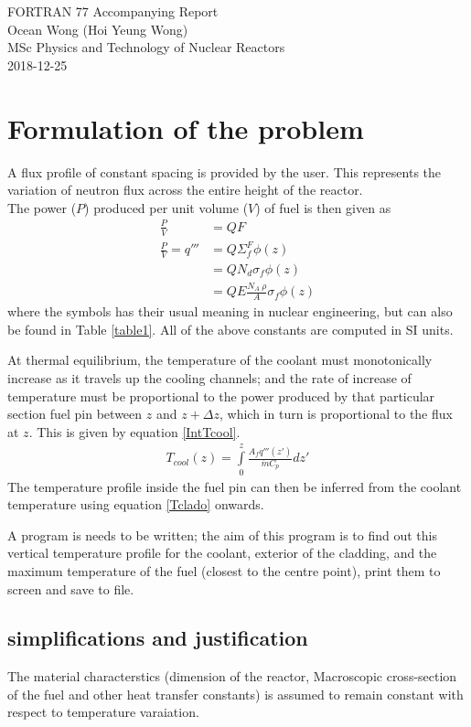 \documentclass[a4paper, 12pt]{article}
\begin{document}
\begin{center}
FORTRAN 77 Accompanying Report					\\
Ocean Wong (Hoi Yeung Wong)						\\
MSc Physics and Technology of Nuclear Reactors	\\
2018-12-25										\\
\end{center}

\section{Formulation of the problem}
A flux profile of constant spacing is provided by the user. This represents the variation of neutron flux across the entire height of the reactor.\\
The power ($P$) produced per unit volume ($V$) of fuel is then given as
\begin{align}
\frac{P}{V} &=  Q F  							\label{FirstEq} \\
\frac{P}{V} =q''' &= Q \Sigma_f^F \phi(z)						\\
  &= Q N_d \sigma_f \phi(z) 						\\
  &= Q E \frac{N_A \:\rho}{A} \sigma_f \phi(z) \label{ExpandedQ'''}
\end{align}
where the symbols has their usual meaning in nuclear engineering, but can also be found in Table \ref{table1}.
All of the above constants are computed in SI units.

At thermal equilibrium, the temperature of the coolant must monotonically increase as it travels up the cooling channels; and the rate of increase of temperature must be proportional to the power produced by that particular section fuel pin between $z$ and $z+\Delta z$, which in turn is proportional to the flux at $z$. This is given by equation \ref{IntTcool}.
\begin{align}
	T_{cool}(z)=\int\limits_{0}^{z} \frac{A_f q'''(z')}{\dot{m}C_p} dz'
	\label{IntTcool}
\end{align}
The temperature profile inside the fuel pin can then be inferred from the coolant temperature using equation \ref{Tclado} onwards.

A program is needs to be written; the aim of this program is to find out this vertical temperature profile for the coolant, exterior of the cladding, and the maximum temperature of the fuel (closest to the centre point), print them to screen and save to file.

\subsection{simplifications and justification}
The material characterstics (dimension of the reactor, Macroscopic cross-section of the fuel and other heat transfer constants) is assumed to remain constant with respect to temperature varaiation.\\
\end{document}
